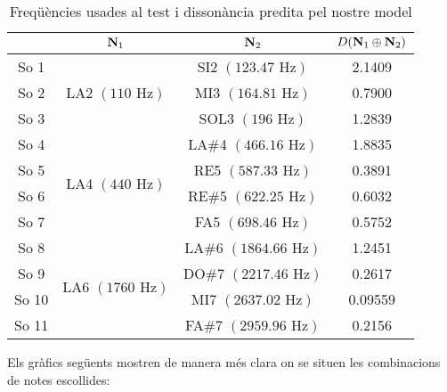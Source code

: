 \documentclass{article}
\theoremstyle{math}
\theoremstyle{TheoremNum}
\newcommand{\0}{\ensuremath{\vb{0}}}
\newcommand{\N}{\ensuremath{\vb{N}}}
\newcommand\Hz{\text{ Hz}}
\begin{document}
\begin{table}[ht]
  \centering
  \begin{tabular}{| c | c | c | c |}
    \cline{2-4}
    \multicolumn{1}{c|}{} & $\N_1$                               & $\N_2$               & $D(\N_1\oplus\N_2)$ \\
    \hline
    \hline
    So 1                  & \multirow{3}{2.5cm}{LA2 $(110\Hz)$}  & SI2 $(123.47\Hz)$    & 2.1409              \\
    \cline{1-1}\cline{3-4}
    So 2                  &                                      & MI3 $(164.81\Hz)$    & 0.7900              \\
    \cline{1-1}\cline{3-4}
    So 3                  &                                      & SOL3 $(196\Hz)$      & 1.2839              \\
    \hline
    So 4                  & \multirow{4}{2.5cm}{LA4 $(440\Hz)$}  & LA\#4 $(466.16\Hz)$  & 1.8835              \\
    \cline{1-1}\cline{3-4}
    So 5                  &                                      & RE5 $(587.33\Hz)$    & 0.3891              \\
    \cline{1-1}\cline{3-4}
    So 6                  &                                      & RE\#5 $(622.25\Hz)$  & 0.6032              \\
    \cline{1-1}\cline{3-4}
    So 7                  &                                      & FA5 $(698.46\Hz)$    & 0.5752              \\
    \hline
    So 8                  & \multirow{4}{2.5cm}{LA6 $(1760\Hz)$} & LA\#6 $(1864.66\Hz)$ & 1.2451              \\
    \cline{1-1}\cline{3-4}
    So 9                  &                                      & DO\#7 $(2217.46\Hz)$ & 0.2617              \\
    \cline{1-1}\cline{3-4}
    So 10                 &                                      & MI7 $(2637.02\Hz)$   & 0.09559             \\
    \cline{1-1}\cline{3-4}
    So 11                 &                                      & FA\#7 $(2959.96\Hz)$ & 0.2156              \\
    \hline
  \end{tabular}
  \caption{Freqüències usades al test i dissonància predita pel nostre model}
  \label{tab:3}
\end{table}\par
\noindent Els gràfics següents mostren de manera més clara on se situen les combinacions de notes escollides:
\end{document}

